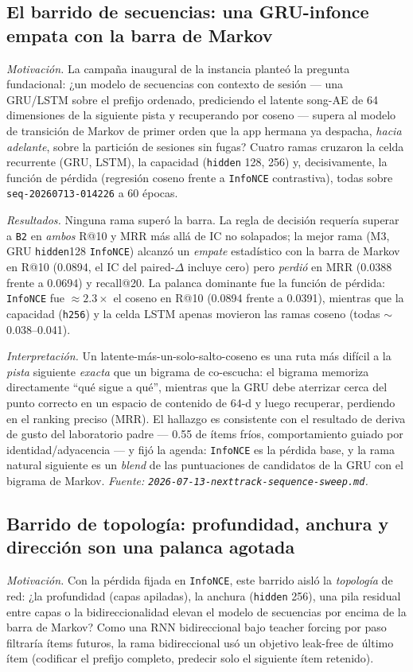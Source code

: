 \documentclass[11pt]{article}
\newcommand{\dsid}[1]{\texttt{\small #1}}
\begin{document}
\subsection{El barrido de secuencias: una GRU-infonce empata con la barra de Markov}
\label{sec:nexttrack-sweep}
\emph{Motivación.} La campaña inaugural de la instancia planteó la pregunta
fundacional: ¿un modelo de secuencias con contexto de sesión --- una GRU/LSTM sobre
el prefijo ordenado, prediciendo el latente song-AE de 64 dimensiones de la
siguiente pista y recuperando por coseno --- supera al modelo de transición de
Markov de primer orden que la app hermana ya despacha, \emph{hacia adelante}, sobre
la partición de sesiones sin fugas? Cuatro ramas cruzaron la celda recurrente
(GRU, LSTM), la capacidad (\texttt{hidden} 128, 256) y, decisivamente, la función
de pérdida (regresión coseno frente a \texttt{InfoNCE} contrastiva), todas sobre
\dsid{seq-20260713-014226} a 60 épocas.

\emph{Resultados.} Ninguna rama superó la barra. La regla de decisión requería
superar a \texttt{B2} en \emph{ambos} R@10 y MRR más allá de IC no solapados; la
mejor rama (M3, GRU \texttt{hidden}128 \texttt{InfoNCE}) alcanzó un \emph{empate}
estadístico con la barra de Markov en R@10 (\num{0.0894}, el IC del paired-$\Delta$
incluye cero) pero \emph{perdió} en MRR (\num{0.0388} frente a \num{0.0694}) y
recall@20. La palanca dominante fue la función de pérdida: \texttt{InfoNCE} fue
$\approx 2.3\times$ el coseno en R@10 (\num{0.0894} frente a \num{0.0391}),
mientras que la capacidad (\texttt{h256}) y la celda LSTM apenas movieron las ramas
coseno (todas $\sim$0.038--0.041).

\emph{Interpretación.} Un latente-más-un-solo-salto-coseno es una ruta más difícil
a la \emph{pista} siguiente \emph{exacta} que un bigrama de co-escucha: el bigrama
memoriza directamente ``qué sigue a qué'', mientras que la GRU debe aterrizar cerca
del punto correcto en un espacio de contenido de 64-d y luego recuperar, perdiendo
en el ranking preciso (MRR). El hallazgo es consistente con el resultado de deriva
de gusto del laboratorio padre --- \num{0.55} de ítems fríos, comportamiento guiado
por identidad/adyacencia --- y fijó la agenda: \texttt{InfoNCE} es la pérdida base,
y la rama natural siguiente es un \emph{blend} de las puntuaciones de candidatos de
la GRU con el bigrama de Markov.
\emph{Fuente: \texttt{2026-07-13-nexttrack-sequence-sweep.md}.}

\subsection{Barrido de topología: profundidad, anchura y dirección son una palanca agotada}
\label{sec:nexttrack-topology}
\emph{Motivación.} Con la pérdida fijada en \texttt{InfoNCE}, este barrido aisló la
\emph{topología} de red: ¿la profundidad (capas apiladas), la anchura
(\texttt{hidden} 256), una pila residual entre capas o la bidireccionalidad elevan
el modelo de secuencias por encima de la barra de Markov? Como una RNN
bidireccional bajo teacher forcing por paso filtraría ítems futuros, la rama
bidireccional usó un objetivo leak-free de último ítem (codificar el prefijo
completo, predecir solo el siguiente ítem retenido).
\end{document}
